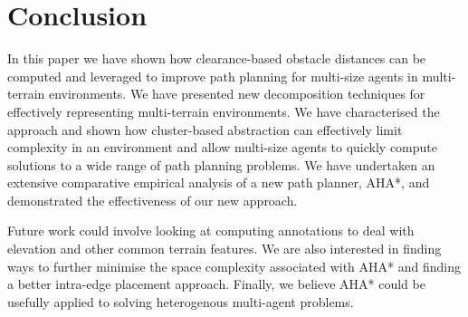 \section{Conclusion}
In this paper we have shown how clearance-based obstacle distances can be computed and leveraged to improve path planning for multi-size agents in multi-terrain environments. 
We have presented new decomposition techniques for effectively representing multi-terrain environments.
We have characterised the approach and shown how cluster-based abstraction can effectively limit complexity in an environment and allow multi-size agents to quickly compute solutions to a wide range of path planning problems. 
We have undertaken an extensive comparative empirical analysis of a new path planner, AHA*, and demonstrated the effectiveness of our new approach. 
\par \indent
Future work could involve looking at computing annotations to deal with elevation and other common terrain features. We are also interested in finding ways to further minimise the space complexity associated with AHA* and finding a better intra-edge placement approach. Finally, we believe AHA* could be usefully applied to solving heterogenous multi-agent problems.
